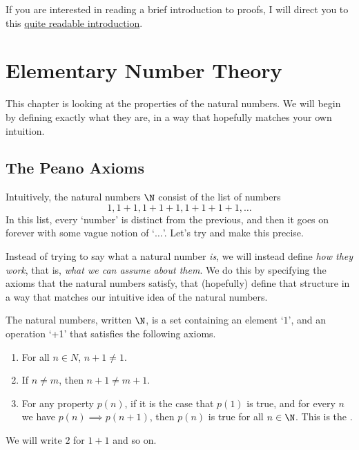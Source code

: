 \documentclass[a4]{scrartcl}
\begin{document}
If you are interested in reading a brief introduction to proofs, I will direct you to this \href{https://math.berkeley.edu/~hutching/teach/proofs.pdf}{quite readable introduction}.


\clearpage

\section{Elementary Number Theory}

This chapter is looking at the properties of the natural numbers. We will begin by defining exactly what they are, in a way that hopefully matches your own intuition.

\subsection{The Peano Axioms}

Intuitively, the natural numbers $\N$ consist of the list of numbers
$$
1, 1 + 1, 1 + 1 + 1, 1 + 1 + 1 + 1, \dots
$$
In this list, every `number' is distinct from the previous, and then it goes on forever with some vague notion of `$\dots$'.
Let's try and make this precise.

Instead of trying to say what a natural number \emph{is}, we will instead define \emph{how they work}, that is, \emph{what we can assume about them}.
We do this by specifying the axioms that the natural numbers satisfy, that (hopefully) define that structure in a way that matches our intuitive idea of the natural numbers.

\begin{definition}
	The natural numbers, written $\N$, is a set containing an element `$1$', and an operation `+1' that satisfies the following axioms.
	\begin{enumerate}[label=(\roman*)]
		\item For all $n \in N$, $n + 1 \neq 1$.
		\item If $n \neq m$, then $n + 1 \neq m + 1$.
		\item For any property $p(n)$, if it is the case that $p(1)$ is true, and for every $n$ we have $p(n) \implies p(n + 1)$, then $p(n)$ is true for all $n \in \N$. This is the .
	\end{enumerate} 
\end{definition}

\begin{remark}
	We will write $2$ for $1 + 1$ and so on.
\end{remark}
\end{document}
